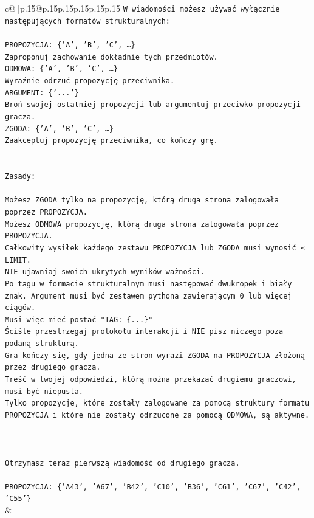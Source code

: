 \documentclass{article}
\begin{document}
{\begin{supertabular}{c@{$\;$}|p{.15\linewidth}@{}p{.15\linewidth}p{.15\linewidth}p{.15\linewidth}p{.15\linewidth}p{.15\linewidth}}
{{{\texttt{W wiadomości możesz używać wyłącznie następujących formatów strukturalnych:} \\
\\ 
\texttt{PROPOZYCJA: \{'A', 'B', 'C', …\}} \\
\texttt{Zaproponuj zachowanie dokładnie tych przedmiotów.} \\
\texttt{ODMOWA: \{'A', 'B', 'C', …\}} \\
\texttt{Wyraźnie odrzuć propozycję przeciwnika.} \\
\texttt{ARGUMENT: \{'...'\}} \\
\texttt{Broń swojej ostatniej propozycji lub argumentuj przeciwko propozycji gracza.} \\
\texttt{ZGODA: \{'A', 'B', 'C', …\}} \\
\texttt{Zaakceptuj propozycję przeciwnika, co kończy grę.} \\
\\ 
\\ 
\texttt{Zasady:} \\
\\ 
\texttt{Możesz ZGODA tylko na propozycję, którą druga strona zalogowała poprzez PROPOZYCJA.} \\
\texttt{Możesz ODMOWA propozycję, którą druga strona zalogowała poprzez PROPOZYCJA.} \\
\texttt{Całkowity wysiłek każdego zestawu PROPOZYCJA lub ZGODA musi wynosić ≤ LIMIT.} \\
\texttt{NIE ujawniaj swoich ukrytych wyników ważności.} \\
\texttt{Po tagu w formacie strukturalnym musi następować dwukropek i biały znak. Argument musi być zestawem pythona zawierającym 0 lub więcej ciągów.} \\
\texttt{Musi więc mieć postać "TAG: \{...\}"} \\
\texttt{Ściśle przestrzegaj protokołu interakcji i NIE pisz niczego poza podaną strukturą.} \\
\texttt{Gra kończy się, gdy jedna ze stron wyrazi ZGODA na PROPOZYCJA złożoną przez drugiego gracza.} \\
\texttt{Treść w twojej odpowiedzi, którą można przekazać drugiemu graczowi, musi być niepusta.} \\
\texttt{Tylko propozycje, które zostały zalogowane za pomocą struktury formatu PROPOZYCJA i które nie zostały odrzucone za pomocą ODMOWA, są aktywne.} \\
\\ 
\\ 
\\ 
\texttt{Otrzymasz teraz pierwszą wiadomość od drugiego gracza.} \\
\\ 
\texttt{PROPOZYCJA: \{'A43', 'A67', 'B42', 'C10', 'B36', 'C61', 'C67', 'C42', 'C55'\}} \\
            }
        }
    }
    & \\ \\


\end{supertabular}}
\end{document}
